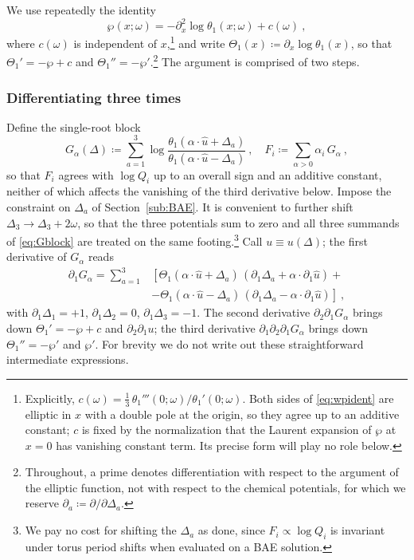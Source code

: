 \documentclass[aps, prx, nofootinbib, twocolumn,amsfonts,amsmath,amssymb,mathtools,superscriptaddress,preprintnumbers,floatfix,reprint]{revtex4-2}
\begin{document}
We use repeatedly the identity
\begin{equation}\label{eq:wpident}
  \wp(x;\omega)=-\partial_x^2\log\theta_1(x;\omega)+c(\omega)\ ,
\end{equation}
where $c(\omega)$ is independent of $x$,\footnote{Explicitly,
$c(\omega)=\tfrac13\,\theta_1'''(0;\omega)/\theta_1'(0;\omega)$. Both sides of
\eqref{eq:wpident} are elliptic in $x$ with a double pole at the origin, so they
agree up to an additive constant; $c$ is fixed by the normalization that the
Laurent expansion of $\wp$ at $x=0$ has vanishing constant term. Its precise
form will play no role below.} and write $\Theta_1(x)\coloneqq\partial_x\log\theta_1(x)$, so that $\Theta_1'=-\wp+c$
and $\Theta_1''=-\wp'$.\footnote{Throughout, a prime denotes differentiation with
respect to the argument of the elliptic function, not with respect to the
chemical potentials, for which we reserve $\partial_a\coloneqq\partial/\partial\Delta_a$.} The argument is comprised of two steps.

\subsubsection{Differentiating three times}

Define the single-root block
\begin{equation}\label{eq:Gblock}
  G_\alpha(\Delta)\coloneqq\sum_{a=1}^{3}
  \log\frac{\theta_1(\alpha\cdot \hat u+\Delta_a)}{\theta_1(\alpha\cdot \hat u-\Delta_a)}\ ,
  \quad F_i\coloneqq\sum_{\alpha>0}\alpha_i\,G_\alpha\ ,
\end{equation}
so that $F_i$ agrees with $\log Q_i$ up to an overall sign and an additive
constant, neither of which affects the vanishing of the third derivative below.
Impose the constraint on $\Delta_a$ of Section~\ref{sub:BAE}. It is convenient
to further shift $\Delta_3\to\Delta_3+2\omega$, so that the three potentials sum to zero
and all three summands of \eqref{eq:Gblock} are treated on the same footing.\footnote{We pay no cost for shifting the $\Delta_a$ as done, since $F_i \propto \log Q_i $ is invariant under torus period shifts when evaluated on a BAE solution.} Call $u\equiv u(\Delta)$; the first derivative of $G_\alpha$ reads
\begin{eqnarray}\label{eq:firstderiv}
  \partial_1G_\alpha= \sum_{a=1}^3&\left[\Theta_1(\alpha\cdot \hat u+\Delta_a)\,
    \left(\partial_1\Delta_a+\alpha\cdot\partial_1 \hat u\right)+\right.\nonumber \\
   &\left.-\Theta_1(\alpha\cdot \hat u-\Delta_a)\,
    \left(\partial_1\Delta_a-\alpha\cdot\partial_1 \hat u\right)\right]\ ,
\end{eqnarray}
with $\partial_1\Delta_1=+1$, $\partial_1\Delta_2=0$, $\partial_1\Delta_3=-1$.
The second derivative $\partial_2\partial_1G_\alpha$ brings down
$\Theta_1'=-\wp+c$ and $\partial_2\partial_1u$; the third derivative
$\partial_1\partial_2\partial_1G_\alpha$ brings down $\Theta_1''=-\wp'$ and
$\wp'$. For brevity we do not write out these straightforward intermediate
expressions.
\end{document}
